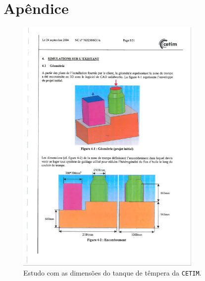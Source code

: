 \setlength{\headheight}{13.9pt}
\chapter{Apêndice} \label{ap:ap1}
\begin{figure}[htpb]
    \centering
    \includegraphics[width=0.8\textwidth]{Figures/Apendix/bac_de_trempe.png}
    \caption{Estudo com as dimensões do tanque de têmpera da \texttt{CETIM}.}
    \label{fig:bac_de_trempe}
\end{figure}
\newpage
